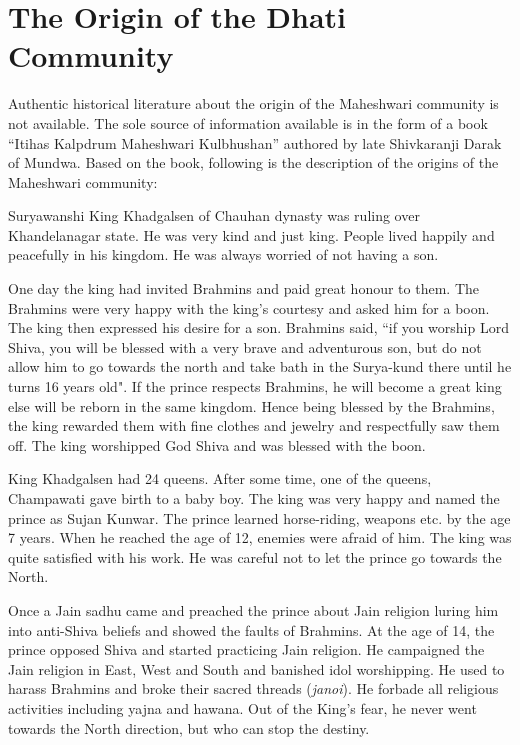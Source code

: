 \chapter{The Origin of the Dhati Community}
Authentic historical literature about the origin of the Maheshwari community is not available. The sole source of information available is in the form of a book ``Itihas Kalpdrum Maheshwari Kulbhushan'' authored by late Shivkaranji Darak of Mundwa. Based on the book, following is the description of the origins of the Maheshwari community:

Suryawanshi King Khadgalsen of Chauhan dynasty was ruling over Khandelanagar state. He was very kind and just king. People lived happily and peacefully in his kingdom. He was always worried of not having a son.

One day the king had invited Brahmins and paid great honour to them. The Brahmins were very happy with the king's courtesy and asked him for a boon. The king then expressed his desire for a son. Brahmins said, ``if you worship Lord Shiva, you will be blessed with a very brave and adventurous son, but do not allow him to go towards the north and take bath in the Surya-kund there until he turns 16 years old". If the prince respects Brahmins, he will become a great king else will be reborn in the same kingdom. Hence being blessed by the Brahmins, the king rewarded them with fine clothes and jewelry and respectfully saw them off. The king worshipped God Shiva and was blessed with the boon.

King Khadgalsen had 24 queens. After some time, one of the queens, Champawati gave birth to a baby boy. The king was very happy and named the prince as Sujan Kunwar. The prince learned horse-riding, weapons etc. by the age 7 years. When he reached the age of 12, enemies were afraid of him. The king was quite satisfied with his work. He was careful not to let the prince go towards the North.

Once a Jain sadhu came and preached the prince about Jain religion luring him into anti-Shiva beliefs and showed the faults of Brahmins. At the age of 14, the prince opposed Shiva and started practicing Jain religion. He campaigned the Jain religion in East, West and South and banished idol worshipping. He used to harass Brahmins and broke their sacred threads (\textit{janoi}). He forbade all religious activities including yajna and hawana. Out of the King's fear, he never went towards the North direction, but who can stop the destiny.

